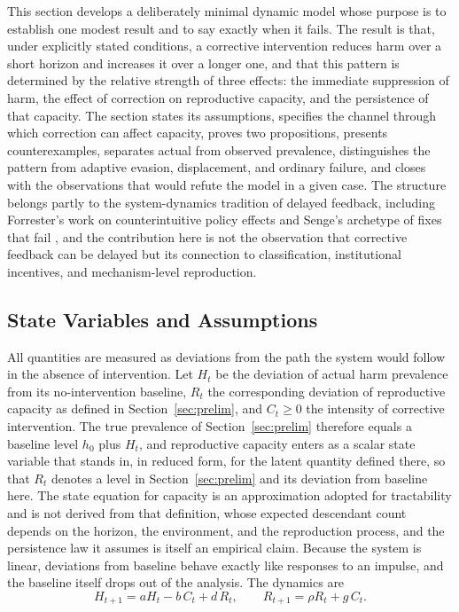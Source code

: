 \documentclass[12pt]{article}
\theoremstyle{remark}
\begin{document}
This section develops a deliberately minimal dynamic model whose purpose is to establish one modest result and to say exactly when it fails. The result is that, under explicitly stated conditions, a corrective intervention reduces harm over a short horizon and increases it over a longer one, and that this pattern is determined by the relative strength of three effects: the immediate suppression of harm, the effect of correction on reproductive capacity, and the persistence of that capacity. The section states its assumptions, specifies the channel through which correction can affect capacity, proves two propositions, presents counterexamples, separates actual from observed prevalence, distinguishes the pattern from adaptive evasion, displacement, and ordinary failure, and closes with the observations that would refute the model in a given case. The structure belongs partly to the system-dynamics tradition of delayed feedback, including Forrester's work on counterintuitive policy effects \cite{forrester1969} and Senge's archetype of fixes that fail \cite{senge1990}, and the contribution here is not the observation that corrective feedback can be delayed but its connection to classification, institutional incentives, and mechanism-level reproduction.

\subsection{State Variables and Assumptions}

All quantities are measured as deviations from the path the system would follow in the absence of intervention. Let $H_t$ be the deviation of actual harm prevalence from its no-intervention baseline, $R_t$ the corresponding deviation of reproductive capacity as defined in Section~\ref{sec:prelim}, and $C_t \ge 0$ the intensity of corrective intervention. The true prevalence of Section~\ref{sec:prelim} therefore equals a baseline level $h_0$ plus $H_t$, and reproductive capacity enters as a scalar state variable that stands in, in reduced form, for the latent quantity defined there, so that $R_t$ denotes a level in Section~\ref{sec:prelim} and its deviation from baseline here. The state equation for capacity is an approximation adopted for tractability and is not derived from that definition, whose expected descendant count depends on the horizon, the environment, and the reproduction process, and the persistence law it assumes is itself an empirical claim. Because the system is linear, deviations from baseline behave exactly like responses to an impulse, and the baseline itself drops out of the analysis. The dynamics are
\begin{equation}
H_{t+1} = a H_t - b\, C_t + d\, R_t, \qquad R_{t+1} = \rho R_t + g\, C_t .
\label{eq:system}
\end{equation}
\end{document}
